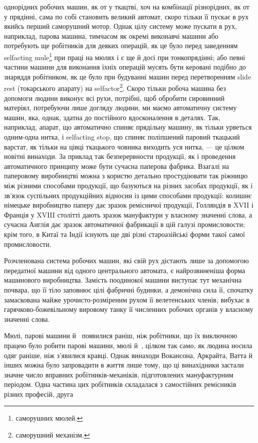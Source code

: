 \parcont{}  %
однорідних робочих машин, як от у ткацтві, хоч на комбінації
різнорідних, як от у прядінні, сама по собі становить великий
автомат, скоро тільки її пускає в рух якийсь перший саморушний
мотор. Однак цілу систему може пускати в рух, наприклад,
парова машина, тимчасом як окремі виконавчі машини або потребують
ще робітників для деяких операцій, як це було перед заведенням
selfacting mule\footnote*{
саморушних мюлей. 
} при праці на мюлях і є ще й досі при тонкопрядінні;
або певні частини машини для виконання їхніх операцій
мусять бути керовані подібно до знаряддя робітником, як це було
при будуванні машин перед перетворенням slide rest (токарського
апарату) на selfactor\footnote*{
саморушний механізм. 
}. Скоро тільки робоча машина без допомоги
людини виконує всі рухи, потрібні, щоб обробити сировинний
матеріял, потребуючи лише догляду людини, ми маємо автоматичну
систему машин, яка, однак, здатна до постійного вдосконалення
в деталях. Так, наприклад, апарат, що автоматично
спиняє прядільну машину, як тільки урветься одним-одна нитка,
і selfacting stop, що спиняє поліпшений паровий ткацький варстат,
як тільки на цівці ткацького човника виходить уся нитка, — це
цілком новітні винаходи. За приклад так безперервности продукції,
як і проведення автоматичного принципу може бути сучасна
паперова фабрика. Взагалі на паперовому виробництві можна з користю
детально простудіювати так ріжницю між різними способами
продукції, що базуються на різних засобах продукції, як
і зв’язок суспільних продукційних відносин із цими способами
продукції: колишнє німецьке виробництво паперу дає зразок ремісничої
продукції, Голляндія в XVII і Франція у XVIII столітті
дають зразок мануфактури у власному значенні слова, а сучасна
Англія дає зразок автоматичної фабрикації в цій галузі промисловости;
крім того, в Китаї та Індії існують ще дві різні староазійські
форми такої самої промисловости.

Розчленована система робочих машин, які свій рух дістають лише
за допомогою передатної машини від одного центрального автомата,
є найрозвиненіша форма машинового виробництва. Замість
поодинокої машини виступає тут механічна почвара, що її тіло
заповнює цілі фабричні будинки, а демонічна сила її, спочатку
замаскована майже урочисто-розміреним рухом її велетенських
членів, вибухає в гарячково-божевільному вировому танку її
численних робочих органів у власному значенні слова.

Мюлі, парові машини й~ появилися раніш, ніж робітники,
що їх виключною працею було робити парові машини, мюлі й~,
цілком так само, як людина носила одяг раніше, ніж з’явилися
кравці. Однак винаходи Вокансона, Аркрайта, Ватта
й інших можна було запровадити в життя лише тому, що ці винахідники
застали значне число вправних робітників-механіків,
підготовлених мануфактурним періодом. Одна частина цих робітників
складалася з самостійних ремісників різних професій, друга
\parbreak{}  %
